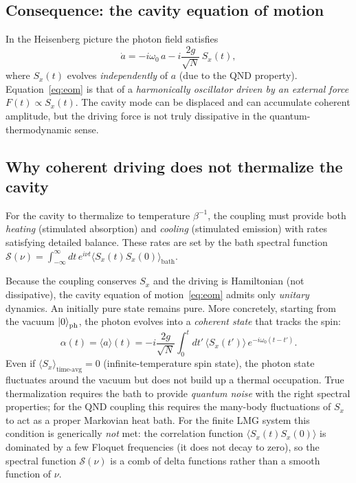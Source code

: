 \documentclass[12pt]{article}
\begin{document}
\subsection{Consequence: the cavity equation of motion}

In the Heisenberg picture the photon field satisfies
\begin{equation}
  \dot a = -i\omega_0\,a - i\frac{2g}{\sqrt{N}}\,S_x(t),
  \label{eq:eom}
\end{equation}
where $S_x(t)$ evolves \emph{independently} of $a$ (due to the QND property).
Equation~\eqref{eq:eom} is that of a \emph{harmonically oscillator driven by an
external force} $F(t)\propto S_x(t)$.  The cavity mode can be displaced and can
accumulate coherent amplitude, but the driving force is not truly dissipative in
the quantum-thermodynamic sense.

\subsection{Why coherent driving does not thermalize the cavity}

For the cavity to thermalize to temperature $\beta^{-1}$, the coupling must
provide both \emph{heating} (stimulated absorption) and \emph{cooling}
(stimulated emission) with rates satisfying detailed balance.  These rates are
set by the bath spectral function
$\mathcal{S}(\nu)=\int_{-\infty}^{\infty}dt\,e^{i\nu t}\langle S_x(t)S_x(0)\rangle_\text{bath}$.

Because the coupling conserves $S_x$ and the driving is Hamiltonian (not
dissipative), the cavity equation of motion~\eqref{eq:eom} admits only
\emph{unitary} dynamics.  An initially pure state remains pure.  More
concretely, starting from the vacuum $\ket{0}_\text{ph}$, the photon evolves
into a \emph{coherent state} that tracks the spin:
\begin{equation}
  \alpha(t) = \langle a\rangle(t) = -i\frac{2g}{\sqrt{N}}
              \int_0^t dt'\,\langle S_x(t')\rangle\,e^{-i\omega_0(t-t')}.
\end{equation}
Even if $\langle S_x\rangle_\text{time-avg}=0$ (infinite-temperature spin
state), the photon state fluctuates around the vacuum but does not build up
a thermal occupation.  True thermalization requires the bath to provide
\emph{quantum noise} with the right spectral properties; for the QND coupling
this requires the many-body fluctuations of $S_x$ to act as a proper Markovian
heat bath.  For the finite LMG system this condition is generically \emph{not}
met: the correlation function $\langle S_x(t)S_x(0)\rangle$ is dominated by a
few Floquet frequencies (it does not decay to zero), so the spectral function
$\mathcal{S}(\nu)$ is a comb of delta functions rather than a smooth function of $\nu$.
\end{document}
